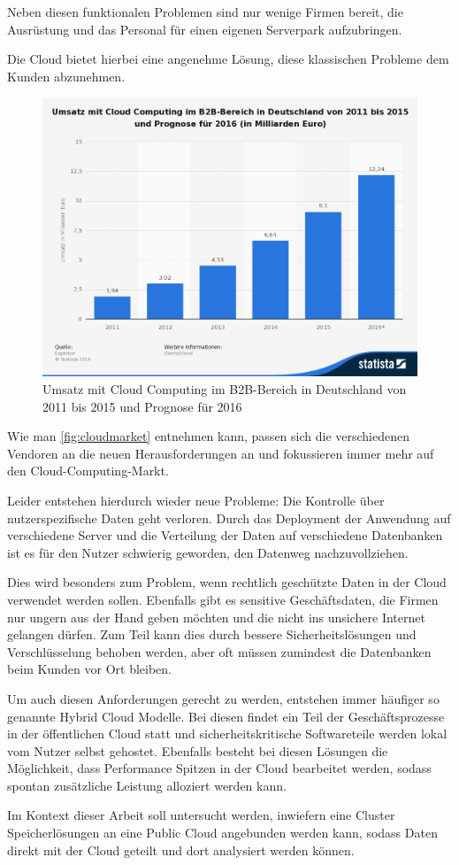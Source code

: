 Neben diesen funktionalen Problemen sind nur wenige Firmen bereit, die Ausrüstung und das Personal für einen eigenen Serverpark aufzubringen.

Die Cloud bietet hierbei eine angenehme Lösung, diese klassischen Probleme dem Kunden abzunehmen.

\begin{figure}[hbt]
	\centering
	\includegraphics[scale=0.5]{images/cloud-computing-market}
	\caption{Umsatz mit Cloud Computing im B2B-Bereich in Deutschland von 2011 bis 2015 und Prognose für 2016 \parencite{statistia.2015}}
	\label{fig:cloudmarket}
\end{figure}

Wie man \autoref{fig:cloudmarket} entnehmen kann, passen sich die verschiedenen Vendoren an die neuen Herausforderungen an und fokussieren immer mehr auf den Cloud-Computing-Markt.

Leider entstehen hierdurch wieder neue Probleme: Die Kontrolle über nutzerspezifische Daten geht verloren. Durch das Deployment der Anwendung auf verschiedene Server und die Verteilung der Daten auf verschiedene Datenbanken ist es für den Nutzer schwierig geworden, den Datenweg nachzuvollziehen.

Dies wird besonders zum Problem, wenn rechtlich geschützte Daten in der Cloud verwendet werden sollen. Ebenfalls gibt es sensitive Geschäftsdaten, die Firmen nur ungern aus der Hand geben möchten und die nicht ins unsichere Internet gelangen dürfen.
Zum Teil kann dies durch bessere Sicherheitslösungen und Verschlüsselung behoben werden, aber oft müssen zumindest die Datenbanken beim Kunden vor Ort bleiben. 

Um auch diesen Anforderungen gerecht zu werden, entstehen immer häufiger so genannte Hybrid Cloud Modelle. Bei diesen findet ein Teil der Geschäftsprozesse in der öffentlichen Cloud statt und sicherheitskritische Softwareteile werden lokal vom Nutzer selbst gehostet. Ebenfalls besteht bei diesen Lösungen die Möglichkeit, dass Performance Spitzen in der Cloud bearbeitet werden, sodass spontan zusätzliche Leistung alloziert werden kann.

Im Kontext dieser Arbeit soll untersucht werden, inwiefern eine Cluster Speicherlösungen an eine Public Cloud angebunden werden kann, sodass Daten direkt mit der Cloud geteilt und dort analysiert werden können. 